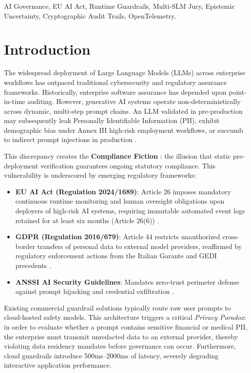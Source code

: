 \documentclass[conference,10pt]{IEEEtran}
\begin{document}
\begin{IEEEkeywords}
AI Governance, EU AI Act, Runtime Guardrails, Multi-SLM Jury, Epistemic Uncertainty, Cryptographic Audit Trails, OpenTelemetry.
\end{IEEEkeywords}

\section{Introduction}
\label{sec:intro}

The widespread deployment of Large Language Models (LLMs) across enterprise workflows has outpaced traditional cybersecurity and regulatory assurance frameworks. Historically, enterprise software assurance has depended upon point-in-time auditing. However, generative AI systems operate non-deterministically across dynamic, multi-step prompt chains. An LLM validated in pre-production may subsequently leak Personally Identifiable Information (PII), exhibit demographic bias under Annex III high-risk employment workflows, or succumb to indirect prompt injections in production \cite{greshake2023not, conformance2026}.

This discrepancy creates the \textbf{Compliance Fiction} \cite{conformance2026}: the illusion that static pre-deployment verification guarantees ongoing statutory compliance. This vulnerability is underscored by emerging regulatory frameworks:
\begin{itemize}
    \item \textbf{EU AI Act (Regulation 2024/1689)}: Article 26 imposes mandatory continuous runtime monitoring and human oversight obligations upon deployers of high-risk AI systems, requiring immutable automated event logs retained for at least six months (Article 26(6)) \cite{euaiact2024}.
    \item \textbf{GDPR (Regulation 2016/679)}: Article 44 restricts unauthorized cross-border transfers of personal data to external model providers, reaffirmed by regulatory enforcement actions from the Italian Garante and GEDI precedents \cite{gdpr2016}.
    \item \textbf{ANSSI AI Security Guidelines}: Mandates zero-trust perimeter defense against prompt hijacking and credential exfiltration \cite{anssi2024}.
\end{itemize}

Existing commercial guardrail solutions typically route raw user prompts to cloud-hosted safety models. This architecture triggers a critical \textit{Privacy Paradox}: in order to evaluate whether a prompt contains sensitive financial or medical PII, the enterprise must transmit unredacted data to an external provider, thereby violating data residency mandates before governance can occur. Furthermore, cloud guardrails introduce 500ms--2000ms of latency, severely degrading interactive application performance.
\end{document}
